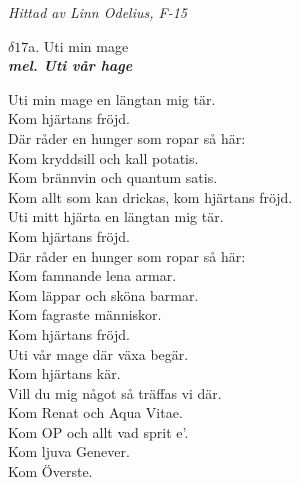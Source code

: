 \documentclass[a6paper,10pt]{article}
\newcommand{\mel}[1]{\small\textbf{\textit{mel. #1 \\}}}
\begin{document}
\begin{flushright}
\textit{Hittad av Linn Odelius, F-15}
\end{flushright}
\setlength{\oddsidemargin}{-0.47in}
\noindent
\begin{center}
\Large $\delta17$a. Uti min mage\\ 
\mel{Uti vår hage}
\end{center}
Uti min mage en längtan mig tär. \\
Kom hjärtans fröjd. \\
Där råder en hunger som ropar så här: \\
Kom kryddsill och kall potatis. \\
Kom brännvin och quantum satis. \\
Kom allt som kan drickas, kom hjärtans fröjd. 
\vspace{5pt}\\
Uti mitt hjärta en längtan mig tär. \\
Kom hjärtans fröjd. \\
Där råder en hunger som ropar så här: \\
Kom famnande lena armar. \\
Kom läppar och sköna barmar. \\
Kom fagraste människor. \\
Kom hjärtans fröjd. 
\vspace{5pt}\\
Uti vår mage där växa begär. \\
Kom hjärtans kär. \\
Vill du mig något så träffas vi där. \\
Kom Renat och Aqua Vitae. \\
Kom OP och allt vad sprit e'. \\
Kom ljuva Genever. \\
Kom Överste. 
\end{document}
